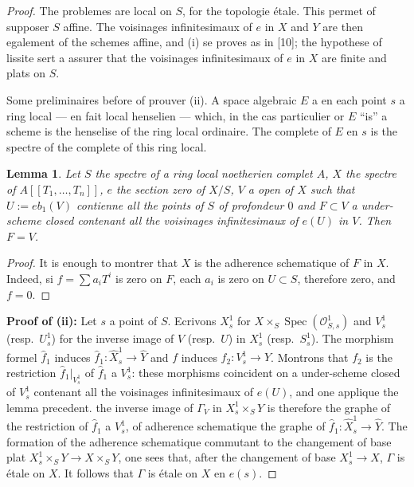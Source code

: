 \documentclass[12pt,a4paper]{article}
\theoremstyle{plain}
\newtheorem{lemma}[theorem]{Lemma}
\theoremstyle{definition}
\theoremstyle{remark}
\DeclareMathOperator{\Spec}{Spec}
\newcommand{\cO}{\mathcal{O}}
\begin{document}
\begin{proof}
The problemes are local on $S$, for the topologie étale. This permet of supposer $S$ affine. The voisinages infinitesimaux of $e$ in $X$ and $Y$ are then egalement of the schemes affine, and (i) se proves as in [10]; the hypothese of lissite sert a assurer that the voisinages infinitesimaux of $e$ in $X$ are finite and plats on $S$.

Some preliminaires before of prouver (ii). A space algebraic $E$ a en each point $s$ a ring local --- en fait local henselien --- which, in the cas particulier or $E$ ``is'' a scheme is the henselise of the ring local ordinaire. The complete of $E$ en $s$ is the spectre of the complete of this ring local.

\begin{lemma}
Let $S$ the spectre of a ring local noetherien complet $A$, $X$ the spectre of $A[[T_1, \ldots, T_n]]$, $e$ the section zero of $X/S$, $V$ a open of $X$ such that $U := eb_1(V)$ contienne all the points of $S$ of profondeur $0$ and $F \subset V$ a under-scheme closed contenant all the voisinages infinitesimaux of $e(U)$ in $V$. Then $F = V$.
\end{lemma}

\begin{proof}
It is enough to montrer that $X$ is the adherence schematique of $F$ in $X$. Indeed, si $f = \sum a_i T^i$ is zero on $F$, each $a_i$ is zero on $U \subset S$, therefore zero, and $f = 0$.
\end{proof}

\textbf{Proof of (ii):} Let $s$ a point of $S$. Ecrivons $X_s^1$ for $X \times_S \Spec(\cO_{S,s}^1)$ and $V_s^1$ (resp.~$U_s^1$) for the inverse image of $V$ (resp.~$U$) in $X_s^1$ (resp.~$S_s^1$). The morphism formel $\hat{f}_1$ induces $\hat{f}_1 : \hat{X}_s^1 \to \hat{Y}$ and $f$ induces $f_2 : V_s^1 \to Y$. Montrons that $f_2$ is the restriction $\hat{f}_1|_{V_s^1}$ of $\hat{f}_1$ a $V_s^1$: these morphisms coincident on a under-scheme closed of $V_s^1$ contenant all the voisinages infinitesimaux of $e(U)$, and one applique the lemma precedent. the inverse image of $\Gamma_V$ in $X_s^1 \times_S Y$ is therefore the graphe of the restriction of $\hat{f}_1$ a $V_s^1$, of adherence schematique the graphe of $\hat{f}_1 : \hat{X}_s^1 \to \hat{Y}$. The formation of the adherence schematique commutant to the changement of base plat $X_s^1 \times_S Y \to X \times_S Y$, one sees that, after the changement of base $X_s^1 \to X$, $\Gamma$ is étale on $X$. It follows that $\Gamma$ is étale on $X$ en $e(s)$.
\end{proof}
\end{document}
